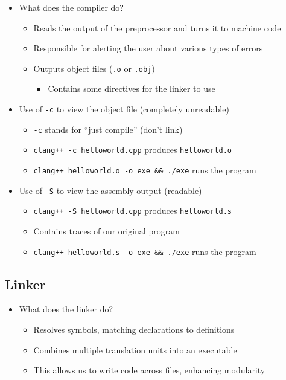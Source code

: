 \documentclass{article}
\begin{document}
\begin{itemize}
	\item What does the compiler do? \begin{itemize}
		\item Reads the output of the preprocessor and turns it to machine code
		\item Responsible for alerting the user about various types of errors
		\item Outputs object files (\texttt{.o} or \texttt{.obj}) \begin{itemize}
			\item Contains some directives for the linker to use
		\end{itemize}
	\end{itemize}
	\item Use of \texttt{-c} to view the object file (completely unreadable)\begin{itemize}
		\item \texttt{-c} stands for ``just compile'' (don't link)
		\item \texttt{clang++ -c helloworld.cpp} produces \texttt{helloworld.o}
		\item \texttt{clang++ helloworld.o -o exe \&\& ./exe} runs the program
	\end{itemize}
	\item Use of \texttt{-S} to view the assembly output (readable)\begin{itemize}
		\item \texttt{clang++ -S helloworld.cpp} produces \texttt{helloworld.s}
		\item Contains traces of our original program
		\item \texttt{clang++ helloworld.s -o exe \&\& ./exe} runs the program
	\end{itemize}
\end{itemize}

\subsection{Linker}

\begin{itemize}
	\item What does the linker do? \begin{itemize}
		\item Resolves symbols, matching declarations to definitions
		\item Combines multiple translation units into an executable
		\item This allows us to write code across files, enhancing modularity
	\end{itemize}
\end{itemize}
\end{document}
